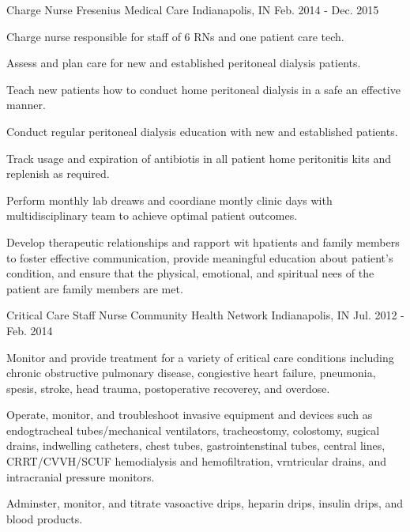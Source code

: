 \begin{cventries}
  \cventry
    {Charge Nurse} %
    {Fresenius Medical Care} %
    {Indianapolis, IN} %
    {Feb. 2014 - Dec. 2015} %
    {
      \begin{cvitems} %
        \item {Charge nurse responsible for staff of 6 RNs and one patient care tech.}
        \item {Assess and plan care for new and established peritoneal dialysis patients.}
        \item {Teach new patients how to conduct home peritoneal dialysis in a safe an effective manner.}
        \item {Conduct regular peritoneal dialysis education with new and established patients.}
        \item {Track usage and expiration of antibiotis in all patient home peritonitis kits and replenish as required.}
        \item {Perform monthly lab dreaws and coordiane montly clinic days with multidisciplinary team to achieve optimal patient outcomes.}
        \item {Develop therapeutic relationships and rapport wit hpatients and family members to foster effective communication, provide meaningful education about patient's condition, and ensure that the physical, emotional, and spiritual nees of the patient are family members are met.}
      \end{cvitems}
    }

  \cventry
    {Critical Care Staff Nurse} %
    {Community Health Network} %
    {Indianapolis, IN} %
    {Jul. 2012 - Feb. 2014} %
    {
      \begin{cvitems} %
        \item {Monitor and provide treatment for a variety of critical care conditions including chronic obstructive pulmonary disease, congiestive heart failure, pneumonia, spesis, stroke, head trauma, postoperative recoverey, and overdose.}
        \item {Operate, monitor, and troubleshoot invasive equipment and devices such as endogtracheal tubes/mechanical ventilators, tracheostomy, colostomy, sugical drains, indwelling catheters, chest tubes, gastrointenstinal tubes, central lines, CRRT/CVVH/SCUF hemodialysis and hemofiltration, vrntricular drains, and intracranial pressure monitors.}
        \item {Adminster, monitor, and titrate vasoactive drips, heparin drips, insulin drips, and blood products.}
      \end{cvitems}
    }


\end{cventries}
